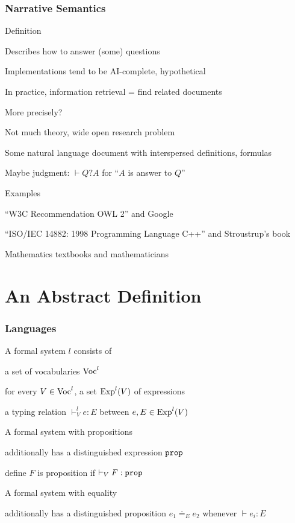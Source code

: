 \begin{frame}\frametitle{Narrative Semantics}
\begin{blockitems}{Definition}
\item Describes how to answer (some) questions
\item Implementations tend to be AI-complete, hypothetical
\item In practice, information retrieval = find related documents
\end{blockitems}

\begin{blockitems}{More precisely?}
\item Not much theory, wide open research problem
\item Some natural language document with interspersed definitions, formulas
\item Maybe judgment: $\vdash Q ? A$ for ``$A$ is answer to $Q$''
\end{blockitems}

\begin{blockitems}{Examples}
\item ``W3C Recommendation OWL 2'' and Google
\item ``ISO/IEC 14882: 1998 Programming Language C++'' and Stroustrup's book
\item Mathematics textbooks and mathematicians
\end{blockitems}
\end{frame}

\section{An Abstract Definition}

\begin{frame}\frametitle{Languages}
\begin{blockitems}{A formal system $l$ consists of}
\item a set of vocabularies $\mathrm{Voc}^l$
\item for every $V\in\mathrm{Voc}^l$, a set $\mathrm{Exp}^l(V)$ of expressions
\item a typing relation $\vdash^l_V e:E$ between $e,E\in \mathrm{Exp}^l(V)$
\end{blockitems}

\begin{blockitems}{A formal system with propositions}
\item additionally has a distinguished expression $\mathtt{prop}$
\item define $F$ is proposition if $\vdash_V F:\mathtt{prop}$
\end{blockitems}

\begin{blockitems}{A formal system with equality}
\item additionally has a distinguished proposition $e_1\doteq_E e_2$ whenever $\vdash e_i:E$
\end{blockitems}
\end{frame}

